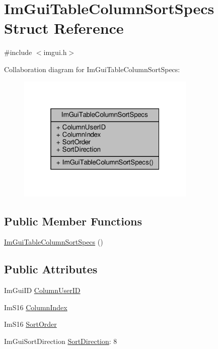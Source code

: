 \hypertarget{structImGuiTableColumnSortSpecs}{}\section{Im\+Gui\+Table\+Column\+Sort\+Specs Struct Reference}
\label{structImGuiTableColumnSortSpecs}


{\ttfamily \#include $<$imgui.\+h$>$}



Collaboration diagram for Im\+Gui\+Table\+Column\+Sort\+Specs\+:
\nopagebreak
\begin{figure}[H]
\begin{center}
\leavevmode
\includegraphics[width=241pt]{structImGuiTableColumnSortSpecs__coll__graph}
\end{center}
\end{figure}
\subsection*{Public Member Functions}
\begin{DoxyCompactItemize}
\item 
\hyperlink{structImGuiTableColumnSortSpecs_afa6c5d62b412c939e4b5593868521772}{Im\+Gui\+Table\+Column\+Sort\+Specs} ()
\end{DoxyCompactItemize}
\subsection*{Public Attributes}
\begin{DoxyCompactItemize}
\item 
Im\+Gui\+ID \hyperlink{structImGuiTableColumnSortSpecs_a90cc5f61baef5f5a60fb159fd3086b36}{Column\+User\+ID}
\item 
Im\+S16 \hyperlink{structImGuiTableColumnSortSpecs_af0f6581773139ce274e04f4ef781aa46}{Column\+Index}
\item 
Im\+S16 \hyperlink{structImGuiTableColumnSortSpecs_a53bb2301b5c97cce7b44cabb2f505df4}{Sort\+Order}
\item 
Im\+Gui\+Sort\+Direction \hyperlink{structImGuiTableColumnSortSpecs_ab0c2670b73e504825ae3d73b61f3916f}{Sort\+Direction}\+: 8
\end{DoxyCompactItemize}


